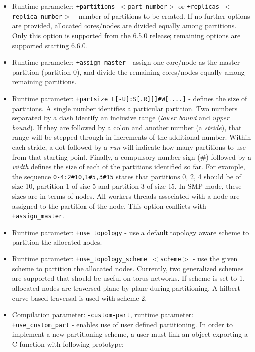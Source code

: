 \begin{itemize}
\item Runtime parameter: {\tt +partitions $<$part\_number$>$} or {\tt +replicas
$<$replica\_number$>$} - number of partitions to be created. If no further options are
provided, allocated cores/nodes are divided equally among partitions. Only this option 
is supported from the 6.5.0 release; remaining options are supported starting 6.6.0.

\item Runtime parameter: {\tt +assign\_master} - assign one core/node as the master 
partition (partition 0), and divide the remaining cores/nodes equally among remaining
partitions.

\item Runtime parameter: {\tt +partsize L[-U[:S[.R]]]\#W[,...]} - defines the size of 
partitions.  A single number identifies a particular partition. Two numbers separated by
a dash identify an inclusive range (\emph{lower bound} and \emph{upper bound}). If they 
are followed by a colon and another number (a \emph{stride}), that range will be stepped 
through in increments of the additional number. Within each stride, a dot followed by a
\emph{run} will indicate how many partitions to use from that starting point.  Finally, 
a compulsory number sign (\#) followed by a \emph{width} defines the size of each of the
partitions identified so far. For example, the sequence {\tt 0-4:2\#10,1\#5,3\#15} states that 
partitions 0, 2, 4 should be of size 10, partition 1 of size 5 and partition 3 of size 15. 
In SMP mode, these sizes are in terms of nodes. All workers threads associated with a node are
assigned to the partition of the node. This option conflicts with {\tt +assign\_master}.

\item Runtime parameter: {\tt +use\_topology} - use a default topology aware scheme
to partition the allocated nodes. 

\item Runtime parameter: {\tt +use\_topology\_scheme $<$scheme$>$} - use the given scheme
to partition the allocated nodes. Currently, two generalized schemes are supported that 
should be useful on torus networks. If scheme is set to 1, allocated nodes are traversed 
plane by plane during partitioning. A hilbert curve based traversal is used with scheme 2.

\item Compilation parameter: {\tt -custom-part}, runtime parameter: {\tt +use\_custom\_part} -
enables use of user defined partitioning. In order to implement a new partitioning scheme, 
a user must link an object exporting a C function with following prototype: \\ 


\end{itemize}
